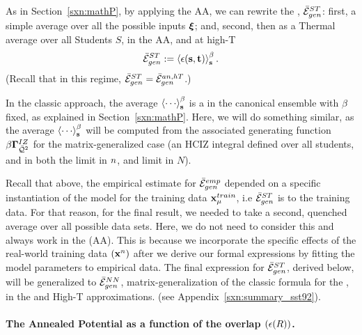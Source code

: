 As in Section~\ref{sxn:mathP}, by applying the AA, we can rewrite the \AverageSTGeneralizationError, $\bar{\mathcal{E}}^{ST}_{gen}$:
first, a simple average over all the possible inputs $\boldsymbol{\xi}$; and, 
second, then as a Thermal average over all Students $S$, in the AA, and at high-T 
\begin{align}
\label{eqn:MGE}
\bar{\mathcal{E}}^{ST}_{gen}:=\left\langle \epsilon({\mathbf{s}}, {\mathbf{t}} ) \right\rangle_{\mathbf s}^{\beta} .
\end{align}
(Recall that in this regime, $\bar{\mathcal{E}}^{ST}_{gen}=\bar{\mathcal{E}}_{gen}^{an,hT}$.)

In the classic \STATMECH approach, the average $\THRMAVG{\cdots}$ is
a \ThermalAverage in the canonical ensemble with $\beta$ fixed,
as explained in Section~\ref{sxn:mathP}.  Here, we will do something similar, as the \Student
average $\THRMAVG{\cdots}$ will be computed from the associated
generating function $\beta\mathbf{\Gamma}^{IZ}_{\bar{\mathcal{Q}}^{2}}$ for the matrix-generalized case  (an HCIZ integral defined over all students,
and in both the \LargeN \Thermodynamic limit in $n$, and \WideLayer \LargeN  limit in $N$).

Recall that above, the empirical estimate for $\bar{\mathcal{E}}^{emp}_{gen}$ depended on a
specific instantiation of the model for the training data $\mathbf{x}_{\mu}^{train}$,
i.e  $\bar{\mathcal{E}}^{ST}_{gen}$ is \Quenched to the training data.
For that reason, for the final result, we needed to take a second,
quenched average over all possible data sets.
Here, we do not need to consider this and always work in the \AnnealedApproximation(AA).
This is because we incorporate
the specific effects of the real-world training data $(\mathbf{x}^{n})$ after we derive our formal expressions
by fitting the model parameters to empirical data.
The final expression for $\bar{\mathcal{E}}^{ST}_{gen}$, derived below,
will be generalized to $\bar{\mathcal{E}}^{NN}_{gen}$, matrix-generalization of  the classic \STATMECH formula
for the \LinearPerceptron, in the \Annealed and High-T approximations.
(see Appendix~\ref{sxn:summary_sst92}). 

\paragraph{The Annealed Potential as a function of the overlap $(\epsilon(R))$.}

